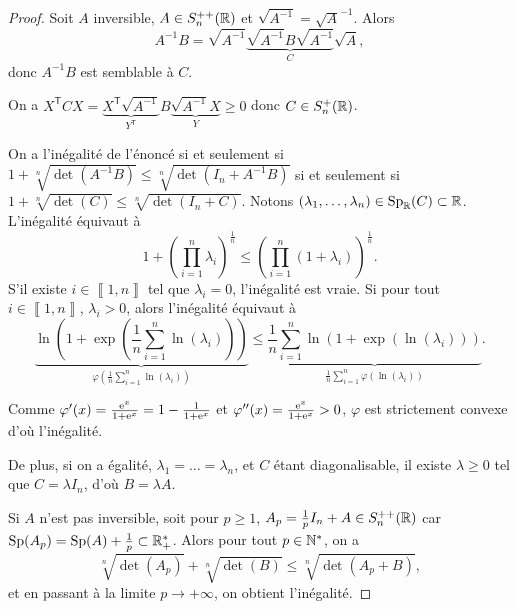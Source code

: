 \documentclass[12pt]{article}
\begin{document}
\begin{proof}
	Soit $A$ inversible, $A\in S_n^{++}(\mathbb{R})$ et $\sqrt{A^{-1}}=\sqrt{A}^{-1}$. Alors 
	\begin{equation}
		A^{-1}B=\sqrt{A^{-1}}\underbrace{\sqrt{A^{-1}}B\sqrt{A^{-1}}}_{C}\sqrt{A},
	\end{equation}
	donc $A^{-1}B$ est semblable à $C$.

	On a $X^{\mathsf{T}}CX=\underbrace{X^{\mathsf{T}}\sqrt{A^{-1}}}_{Y^{\mathsf{T}}}B\underbrace{\sqrt{A^{-1}}X}_{Y}\geqslant0$ donc $C\in S_n^{+}(\mathbb{R})$.

	On a l'inégalité de l'énoncé si et seulement si $1+\sqrt[n]{\det(A^{-1}B)}\leqslant\sqrt[n]{\det(I_n+A^{-1}B)}$ si et seulement si $1+\sqrt[n]{\det(C)}\leqslant\sqrt[n]{\det(I_n+C)}$. Notons $(\lambda_{1},\dots,\lambda_{n})\in\operatorname{Sp}_{\mathbb{R}}(C)\subset\mathbb{R}$. L'inégalité équivaut à 
	\begin{equation}
		1+\left(\prod_{i=1}^{n}\lambda_{i}\right)^{\frac{1}{n}}\leqslant\left(\prod_{i=1}^{n}\left(1+\lambda_{i}\right)\right)^{\frac{1}{n}}.
	\end{equation}
	S'il existe $i\in\left\llbracket1,n\right\rrbracket$ tel que $\lambda_{i}=0$, l'inégalité est vraie. Si pour tout $i\in\left\llbracket1,n\right\rrbracket$, $\lambda_{i}>0$, alors l'inégalité équivaut à 
	\begin{equation}
		\underbrace{\ln\left(1+\exp\left(\frac{1}{n}\sum_{i=1}^{n}\ln(\lambda_{i})\right)\right)}_{\varphi\left(\frac{1}{n}\sum_{i=1}^{n}\ln(\lambda_{i})\right)}\leqslant\underbrace{\frac{1}{n}\sum_{i=1}^{n}\ln\left(1+\exp\left(\ln(\lambda_{i})\right)\right)}_{\frac{1}{n}\sum_{i=1}^{n}\varphi\left(\ln(\lambda_{i})\right)}.
	\end{equation}

	Comme $\varphi'(x)=\frac{\mathrm{e}^{x}}{1+\mathrm{e}^{x}}=1-\frac{1}{1+\mathrm{e}^{x}}$ et $\varphi''(x)=\frac{\mathrm{e}^{x}}{1+\mathrm{e}^{x}}>0$, $\varphi$ est strictement convexe d'où l'inégalité.

	De plus, si on a égalité, $\lambda_{1}=\dots=\lambda_{n}$, et $C$ étant diagonalisable, il existe $\lambda\geqslant0$ tel que $C=\lambda I_n$, d'où $B=\lambda A$.

	Si $A$ n'est pas inversible, soit pour $p\geqslant1$, $A_p=\frac{1}{p}I_n+A\in S_n^{++}(\mathbb{R})$ car $\operatorname{Sp}(A_p)=\operatorname{Sp}(A)+\frac{1}{p}\subset\mathbb{R}_{+}^{*}$. Alors pour tout $p\in\mathbb{N}^{*}$, on a 
	\begin{equation}
		\sqrt[n]{\det(A_p)}+\sqrt[n]{\det(B)}\leqslant\sqrt[n]{\det(A_p+B)},
	\end{equation}
	et en passant à la limite $p\to+\infty$, on obtient l'inégalité.
\end{proof}
\end{document}

